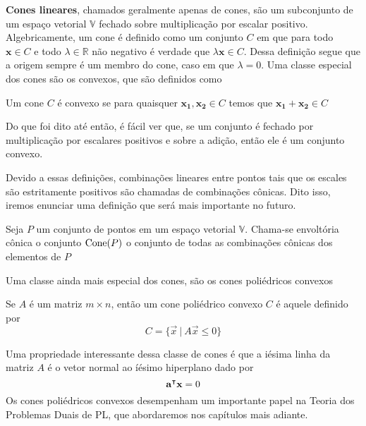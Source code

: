 \textbf{Cones lineares}, chamados geralmente apenas de cones, são um subconjunto de um espaço vetorial $\mathbb{V}$ fechado sobre multiplicação por escalar positivo. Algebricamente, um cone é definido como um conjunto $C$ em que para todo $\mathbf{x} \in C$ e todo $\lambda \in \mathbb{R}$ não negativo é verdade que \(\lambda \mathbf{x} \in C\). Dessa definição segue que a origem sempre é um membro do cone, caso em que $\lambda = 0$. Uma classe especial dos cones são os convexos, que são definidos como

\begin{def:cone convexo}
	Um cone $C$ é convexo se para quaisquer $\mathbf{x_1, x_2} \in C$ temos que $\mathbf{x_1} + \mathbf{x_2} \in C$
\end{def:cone convexo}

Do que foi dito até então, é fácil ver que, se um conjunto é fechado por multiplicação por escalares positivos e sobre a adição, então ele é um conjunto convexo.

Devido a essas definições, combinações lineares entre pontos tais que os escales são estritamente positivos são chamadas de combinações cônicas. Dito isso, iremos enunciar uma definição que será mais importante no futuro.

\begin{def:cone hull}
	Seja $P$ um conjunto de pontos em um espaço vetorial $\mathbb{V}$. Chama-se envoltória cônica o conjunto $\mathrm{Cone}(P)$ o conjunto de todas as combinações cônicas dos elementos de $P$
\end{def:cone hull}

Uma classe ainda mais especial dos cones, são os cones poliédricos convexos

\begin{def:cpc}
	Se $A$ é um matriz $m \times n$, então um cone poliédrico convexo $C$ é aquele definido por
	\begin{equation*}
		C = \{\vec{x}\ |\ A \vec{x} \leq 0\}
	\end{equation*}
\end{def:cpc}

Uma propriedade interessante dessa classe de cones é que a iésima linha da matriz $A$ é o vetor normal ao íésimo hiperplano dado por \[\mathbf{\mathbf{a}^\intercal x} = 0\]Os cones poliédricos convexos desempenham um importante papel na Teoria dos Problemas Duais de PL, que abordaremos nos capítulos mais adiante.

